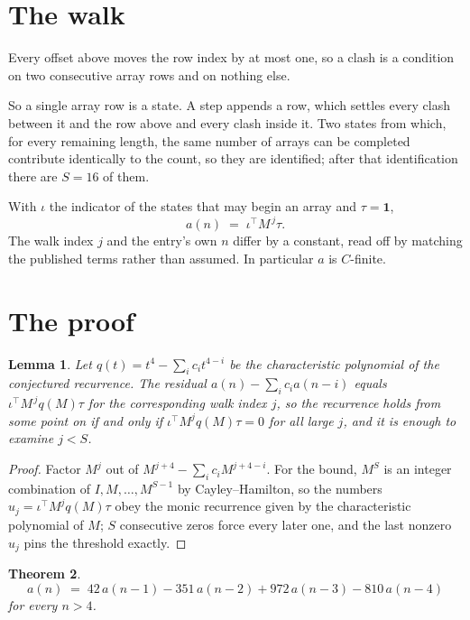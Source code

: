 \documentclass[11pt,a4paper]{article}
\theoremstyle{plain}
\newtheorem{theorem}{Theorem}
\newtheorem{lemma}[theorem]{Lemma}
\theoremstyle{definition}
\begin{document}
\section{The walk}

Every offset above moves the row index by at most one, so a clash is a condition on two
consecutive array rows and on nothing else.

So a single array row is a state. A step appends a row, which settles every clash between it
and the row above and every clash inside it. Two states from which, for every remaining length,
the same number of arrays can be completed contribute identically to the count, so they are
identified; after that identification there are $S=16$ of them.

With $\iota$ the indicator of the states that may begin an array and $\tau=\mathbf{1}$,
\[
a(n)\;=\;\iota^{\!\top}M^{\,j}\tau .
\]
The walk index $j$ and the entry's own $n$ differ by a constant, read off by matching the
published terms rather than assumed. In particular $a$ is $C$-finite.

\section{The proof}

\begin{lemma}\label{lem:crit}
Let $q(t)=t^{4}-\sum_i c_it^{4-i}$ be the characteristic polynomial of the
conjectured recurrence. The residual $a(n)-\sum_ic_ia(n-i)$ equals
$\iota^{\!\top}M^{\,j}q(M)\tau$ for the corresponding walk index $j$, so the recurrence
holds from some point on if and only if $\iota^{\!\top}M^{j}q(M)\tau=0$ for all large $j$,
and it is enough to examine $j<S$.
\end{lemma}

\begin{proof}
Factor $M^{j}$ out of $M^{j+4}-\sum_ic_iM^{j+4-i}$. For the bound, $M^{S}$
is an integer combination of $I,M,\dots,M^{S-1}$ by Cayley--Hamilton, so the numbers
$u_j=\iota^{\!\top}M^{j}q(M)\tau$ obey the monic recurrence given by the characteristic
polynomial of $M$; $S$ consecutive zeros force every later one, and the last nonzero $u_j$
pins the threshold exactly.
\end{proof}

\begin{theorem}
\[
a(n)\;=\;42\,a(n-1) - 351\,a(n-2) + 972\,a(n-3) - 810\,a(n-4)
\]
for every $n>4$.
\end{theorem}
\end{document}
